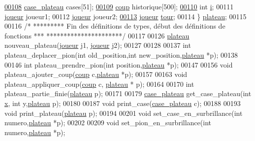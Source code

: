 \begin{DoxyCode}
\hypertarget{plateau_8h_source_l00108}{}\hyperlink{structplateau_a6afaa60f594542e0d742b0c6d3223392}{00108}         \hyperlink{structcase__plateau}{case_plateau} cases[51]; 
\hypertarget{plateau_8h_source_l00109}{}\hyperlink{structplateau_acc4d709134322b5c07f99ea2efd053ef}{00109}         \hyperlink{structcoup}{coup} historique[500];   
\hypertarget{plateau_8h_source_l00110}{}\hyperlink{structplateau_acb559820d9ca11295b4500f179ef6392}{00110}         \textcolor{keywordtype}{int} \hyperlink{structplateau_acb559820d9ca11295b4500f179ef6392}{i}; 
00111         \hyperlink{structjoueur}{joueur} joueur1;
00112         \hyperlink{structjoueur}{joueur} joueur2;
\hypertarget{plateau_8h_source_l00113}{}\hyperlink{structplateau_ab38c06b0c7e61b9eeb63b04c5e5bc652}{00113}         \hyperlink{structjoueur}{joueur} \hyperlink{structplateau_ab38c06b0c7e61b9eeb63b04c5e5bc652}{tour}; 
00114 \} \hyperlink{structplateau}{plateau};
00115 
00116 \textcolor{comment}{/* ********* Fin des définitions de types, début des définitions de fonctions ***
      **********************/}
00117 
00126 \hyperlink{structplateau}{plateau} nouveau\_plateau(\hyperlink{structjoueur}{joueur} j1, \hyperlink{structjoueur}{joueur} j2);
00127 
00128 
00137 \textcolor{keywordtype}{int} plateau\_deplacer\_pion(\textcolor{keywordtype}{int} old\_position,\textcolor{keywordtype}{int} new\_position,\hyperlink{structplateau}{plateau} *p);
00138 
00146 \textcolor{keywordtype}{int} plateau\_prendre\_pion(\textcolor{keywordtype}{int} position,\hyperlink{structplateau}{plateau} *p);
00147 
00156 \textcolor{keywordtype}{void} plateau\_ajouter\_coup(\hyperlink{structcoup}{coup} c,\hyperlink{structplateau}{plateau} *p);
00157 
00163 \textcolor{keywordtype}{void} plateau\_appliquer\_coup(\hyperlink{structcoup}{coup} c, \hyperlink{structplateau}{plateau} * p);
00164 
00170 \textcolor{keywordtype}{int} plateau\_partie\_finie(\hyperlink{structplateau}{plateau} p);
00171 
00179 \hyperlink{structcase__plateau}{case_plateau} get\_case\_plateau(\textcolor{keywordtype}{int} \hyperlink{plateau_8h_a9e00f85b4b6ec2d8bdfbe94ff40f0eeeacab1e15e82c5976bfb476ddfe145263c}{x}, \textcolor{keywordtype}{int} y,\hyperlink{structplateau}{plateau} p);
00180 
00187 \textcolor{keywordtype}{void} print\_case(\hyperlink{structcase__plateau}{case_plateau} c);
00188 
00193 \textcolor{keywordtype}{void} print\_plateau(\hyperlink{structplateau}{plateau} p);
00194 
00201 \textcolor{keywordtype}{void} set\_case\_en\_surbrillance(\textcolor{keywordtype}{int} numero,\hyperlink{structplateau}{plateau} *p);
00202 
00209 \textcolor{keywordtype}{void} set\_pion\_en\_surbrillance(\textcolor{keywordtype}{int} numero,\hyperlink{structplateau}{plateau} *p);

\end{DoxyCode}
